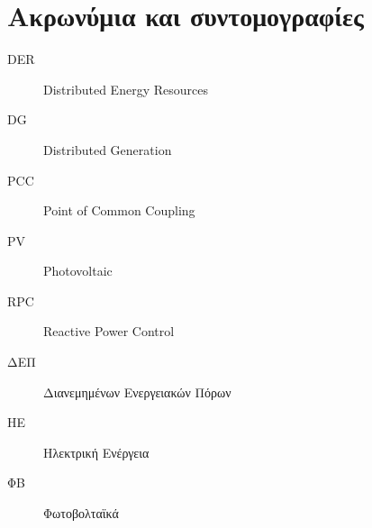 \chapter{Ακρωνύμια και συντομογραφίες}

\begin{description}
   \item [DER] Distributed Energy Resources
   \item [DG]  Distributed Generation 
   \item [PCC] Point of Common Coupling
   \item [PV]  Photovoltaic
   \item [RPC] Reactive Power Control
   
   
\end{description}
\begin{description}
  
   \item[ΔΕΠ] Διανεμημένων Ενεργειακών Πόρων\\
  

   \item[ΗΕ]  Ηλεκτρική Ενέργεια\\
  
   \item[ΦΒ] Φωτοβολταϊκά \mbox{}\\

\end{description}
